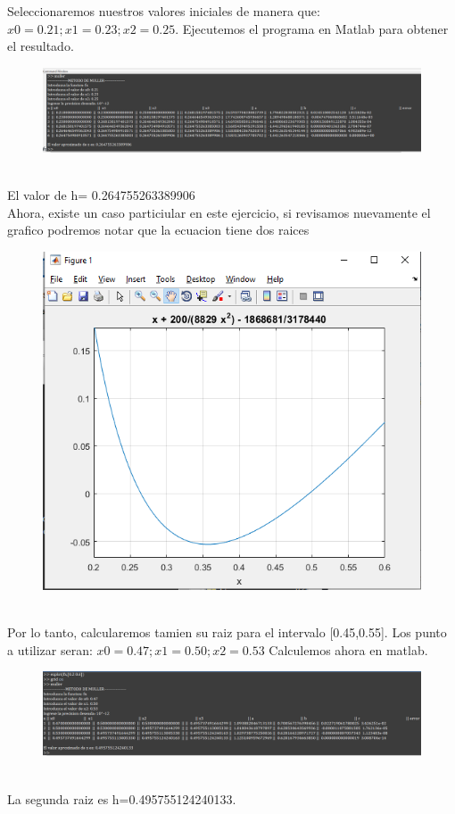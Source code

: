 \documentclass{article}
\theoremstyle{mytheoremstyle}
\theoremstyle{mytheoremstyle}
\theoremstyle{myproblemstyle}
\begin{document}
\noindent Seleccionaremos nuestros valores iniciales de manera que: $x0=0.21; x1=0.23; x2=0.25$. 
Ejecutemos el programa en Matlab para obtener el resultado.
\begin{figure}[ht]
    \includegraphics[scale=0.6]{img/mul34_3.png}
\end{figure}
\\El valor de h= 0.264755263389906
\\Ahora, existe un caso particiular en este ejercicio, si revisamos nuevamente el grafico podremos notar que la ecuacion tiene dos raices
\begin{figure}[ht]
    \includegraphics[scale=0.6]{img/mul34_4.png}
\end{figure}
\\Por lo tanto, calcularemos tamien su raiz para el intervalo [0.45,0.55]. Los punto a utilizar seran: $x0=0.47; x1=0.50; x2=0.53$
Calculemos ahora en matlab.
\pagebreak
\begin{figure}[ht]
    \includegraphics[scale=0.6]{img/mul34_5.png}
\end{figure}
\\La segunda raiz es h=0.495755124240133.
\end{document}
